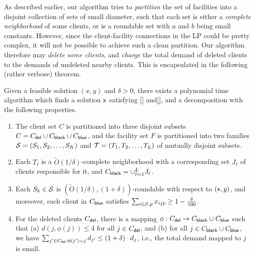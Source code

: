 \medskip \noindent
As described earlier, our algorithm tries to \emph{partition} the set of facilities into a disjoint collection of sets of small diameter, such that each set is either a \emph{complete neighborhood} of some clients, or is a roundable set with $a$ and $b$ being small constants.
However, since the client-facility connections in the LP could be pretty complex, it will not be possible to achieve such a clean partition. Our algorithm therefore may \emph{delete some clients}, and \emph{charge} the total demand of deleted clients to the demands of undeleted nearby clients.
This is encapsulated in the following (rather verbose) theorem. 

\begin{theorem}\label{thm:decomp}
	Given a feasible solution $(x,y)$ and $\delta > 0$, there exists a polynomial time algorithm which finds a solution ${\mathsf x}$ satisfying \eqref{} and\eqref{}, and a 
	decomposition with the following properties.
	\begin{enumerate}%
		\item The client set $C$ is partitioned into three disjoint subsets $C = C_{\mathsf{del}} \cup C_{\mathsf{black}} \cup C_{\mathsf{blue}}$, and the facility set $F$ is partitioned into two families ${\cal S} = (S_1, S_2, \ldots, S_K)$ and ${\cal T} = (T_1, T_2, \ldots, T_L)$ of mutually disjoint subsets.

\item Each $T_\ell$ is a $\tilde{O}(1/\delta)$-complete neighborhood with a corresponding set $J_\ell$ of clients responsible for it, and $C_{\mathsf{black}} = \cup_{\ell = 1}^L J_\ell$.	

		\item Each $S_k \in {\cal S}$ is $(\tilde{O}(1/\delta),(1+\delta))$-roundable with respect to $({\mathsf x},y)$, and moreover, each client in $C_{\mathsf{blue}}$ satisfies $\sum_{i \in {\cal S}, p} x_{ijp} \geq 1 - \frac{\delta}{100}$.

\item For the deleted clients $C_{\mathsf{del}}$, there is a mapping $\phi:C_{\mathsf{del}} \to C_{\mathsf{black}} \cup C_{\mathsf{blue}}$ such that
(a) $d(j,\phi(j)) \leq 4$ for all $j\in C_{\mathsf{del}}$, and
(b)	for all $j\in C_{\mathsf{black}} \cup C_{\mathsf{blue}}$, we have $\sum_{j' \in C_{\mathsf{del}}: \phi(j') = j} d_{j'} \leq (1+\delta)\cdot d_j$, i.e., the total demand mapped to $j$ is small.

\end{enumerate}
\end{theorem}

